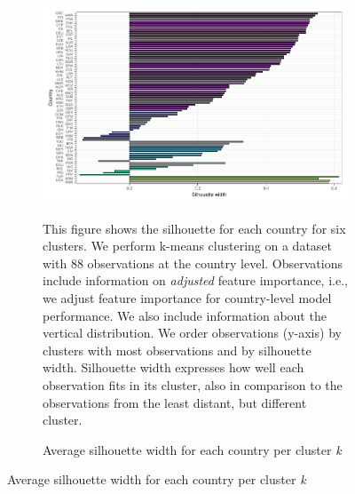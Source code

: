  \begin{figure}[ht!]\ContinuedFloat
   \centering
   \begin{subfigure}[b]{\textwidth}
   \centering
   \includegraphics{Figures_Appendix/Figure_Silhouette_Clusters_2.pdf}
   \caption{Average silhouette width for each country per cluster \textit{k}} \label{fig:G4_silhouette_2}
   \begin{subcaption2}
     This figure shows the silhouette for each country for six clusters. We perform k-means clustering on a dataset with 88 observations at the country level. Observations include information on \textit{adjusted} feature importance, i.e., we adjust feature importance for country-level model performance. We also include information about the vertical distribution. We order observations (y-axis) by clusters with most observations and by silhouette width. Silhouette width expresses how well each observation fits in its cluster, also in comparison to the observations from the least distant, but different cluster.
   \end{subcaption2}
   \end{subfigure}
 \end{figure}
 \clearpage

